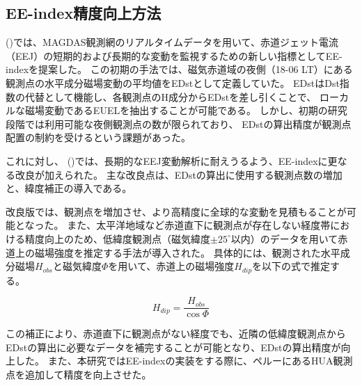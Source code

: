 \subsection{EE-index精度向上方法}

\citeauthor{Uozumi2008} (\citeyear{Uozumi2008})では、MAGDAS観測網のリアルタイムデータを用いて、赤道ジェット電流（EEJ）の短期的および長期的な変動を監視するための新しい指標としてEE-indexを提案した。
この初期の手法では、磁気赤道域の夜側（18-06 LT）にある観測点の水平成分磁場変動の平均値をEDstとして定義していた。
EDstはDst指数の代替として機能し、各観測点のH成分からEDstを差し引くことで、
ローカルな磁場変動であるEUELを抽出することが可能である。
しかし、初期の研究段階では利用可能な夜側観測点の数が限られており、
EDstの算出精度が観測点配置の制約を受けるという課題があった。

これに対し、\citeauthor{Fujimoto2016} (\citeyear{Fujimoto2016})では、長期的なEEJ変動解析に耐えうるよう、EE-indexに更なる改良が加えられた。
主な改良点は、EDstの算出に使用する観測点数の増加と、緯度補正の導入である。

改良版では、観測点を増加させ、より高精度に全球的な変動を見積もることが可能となった。
また、太平洋地域など赤道直下に観測点が存在しない経度帯における精度向上のため、低緯度観測点（磁気緯度$\pm 25^\circ$以内）のデータを用いて赤道上の磁場強度を推定する手法が導入された。
具体的には、観測された水平成分磁場$H_{obs}$と磁気緯度$\Phi$を用いて、赤道上の磁場強度$H_{dip}$を以下の式で推定する。

\begin{equation}
    H_{dip} = \frac{H_{obs}}{\cos \Phi}
\end{equation}

この補正により、赤道直下に観測点がない経度でも、近隣の低緯度観測点からEDstの算出に必要なデータを補完することが可能となり、EDstの算出精度が向上した。
また、本研究ではEE-indexの実装をする際に、ペルーにあるHUA観測点を追加して精度を向上させた。
